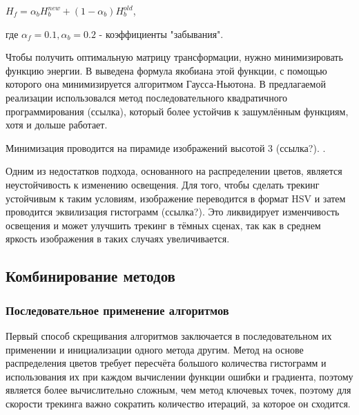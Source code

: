 $
    H_{f} = \alpha_b H_{b}^{new} + (1 - \alpha_b) H_b^{old}
$, 

где $\alpha_f = 0.1, \alpha_b = 0.2$ - коэффициенты "забывания".

Чтобы получить оптимальную матрицу трансформации, нужно минимизировать функцию
энергии.
В \cite{Tjaden2018} выведена формула якобиана этой функции, с помощью которого
она минимизируется алгоритмом Гаусса-Ньютона.
В предлагаемой реализации использовался метод последовательного квадратичного
программирования (ссылка), который более устойчив к зашумлённым функциям, хотя
и дольше работает. 

Минимизация проводится на пирамиде изображений высотой 3 (ссылка?).
.


Одним из недостатков подхода, основанного на распределении цветов, является
неустойчивость к изменению освещения.
Для того, чтобы сделать трекинг устойчивым к таким условиям, изображение
переводится в формат HSV и затем проводится эквилизация гистограмм (ссылка?).
Это ликвидирует изменчивость освещения и может улучшить трекинг в тёмных
сценах, так как в среднем яркость изображения в таких случаях увеличивается.

\subsection{Комбинирование методов}


\subsubsection{Последовательное применение алгоритмов}

Первый способ скрещивания алгоритмов заключается в последовательном их
применении и инициализации одного метода другим.
Метод на основе распределения цветов требует пересчёта большого количества
гистограмм и использования их при каждом вычислении функции ошибки и градиента,
поэтому является более вычислительно сложным, чем метод ключевых точек, поэтому
для скорости трекинга важно сократить количество итераций, за которое он
сходится.

